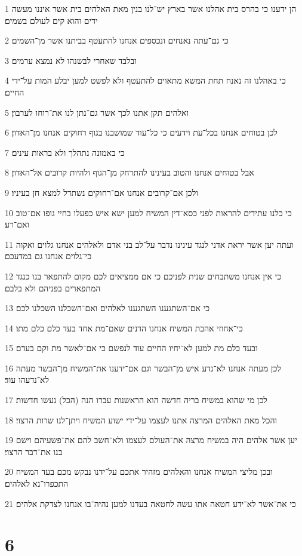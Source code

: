 \par 1 הן ידענו כי בהרס בית אהלנו אשר בארץ יש־לנו בנין מאת האלהים בית אשר איננו מעשה ידים והוא קים לעולם בשמים׃
\par 2 כי גם־עתה נאנחים ונכספים אנחנו להתעטף בביתנו אשר מן־השמים׃
\par 3 ובלבד שאחרי לבשנהו לא נמצא ערמים׃
\par 4 כי באהלנו זה נאנח תחת המשא מתאוים להתעטף ולא לפשט למען יבלע המות על־ידי החיים׃
\par 5 ואלהים תקן אתנו לכך אשר גם־נתן לנו את־רוחו לערבון׃
\par 6 לכן בטוחים אנחנו בכל־עת וידעים כי כל־עוד שמושבנו בגוף רחוקים אנחנו מן־האדון׃
\par 7 כי באמונה נתהלך ולא בראות עינים׃
\par 8 אבל בטוחים אנחנו והטוב בעינינו להתרחק מן־הגוף ולהיות קרובים אל־האדון׃
\par 9 ולכן אם־קרובים אנחנו אם־רחוקים נשתדל למצא חן בעיניו׃
\par 10 כי כלנו עתידים להראות לפני כסא־דין המשיח למען ישא איש כפעלו בחיי גופו אם־טוב ואם־רע׃
\par 11 ועתה יען אשר יראת אדני לנגד עינינו נדבר על־לב בני אדם ולאלהים אנחנו גלוים ואקוה כי־גלוים אנחנו גם במדעכם׃
\par 12 כי אין אנחנו משתבחים שנית לפניכם כי אם ממציאים לכם מקום להתפאר בנו כנגד המתפארים בפניהם ולא בלבם׃
\par 13 כי אם־השתגענו השתגענו לאלהים ואם־השכלנו השכלנו לכם׃
\par 14 כי־אחוזי אהבת המשיח אנחנו הדנים שאם־מת אחד בעד כלם כלם מתו׃
\par 15 ובעד כלם מת למען לא־יחיו החיים עוד לנפשם כי אם־לאשר מת וקם בעדם׃
\par 16 לכן מעתה אנחנו לא־נדע איש מן־הבשר וגם אם־ידענו את־המשיח מן־הבשר מעתה לא־נדעהו עוד׃
\par 17 לכן מי שהוא במשיח בריה חדשה הוא הראשנות עברו הנה (הכל) נעשו חדשות׃
\par 18 והכל מאת האלהים המרצה אתנו לעצמו על־ידי ישוע המשיח ויתן־לנו שרות הרצוי׃
\par 19 יען אשר אלהים היה במשיח מרצה את־העולם לעצמו ולא־חשב להם את־פשעיהם וישם בנו את־דבר הרצוי׃
\par 20 ובכן מליצי המשיח אנחנו והאלהים מזהיר אתכם על־ידנו נבקש מכם בעד המשיח התכפרו־נא לאלהים׃
\par 21 כי את־אשר לא־ידע חטאה אתו עשה לחטאה בעדנו למען נהיה־בו אנחנו לצדקת אלהים׃

\chapter{6}

